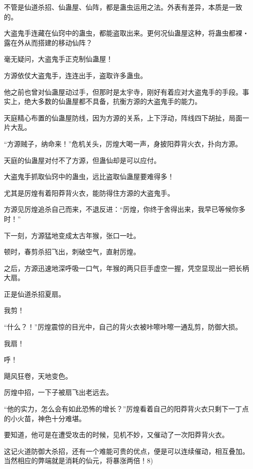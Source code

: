 \begin{this_body}
不管是仙道杀招、仙蛊屋、仙阵，都是蛊虫运用之法。外表有差异，本质是一致的。

大盗鬼手连藏在仙窍中的蛊虫，都能盗取出来。更何况仙蛊屋这种，将蛊虫都裸・露在外从而搭建的移动仙阵？

毫无疑问，大盗鬼手正克制仙蛊屋！

方源依仗大盗鬼手，连连出手，盗取许多蛊虫。

他之前也曾对仙蛊屋动过手，但那时是太宇寺，刚好有着应对大盗鬼手的手段。事实上，绝大多数的仙蛊屋都不具备，抗衡方源的大盗鬼手的能力。

天庭精心布置的仙蛊屋防线，因为方源的关系，上下浮动，阵线四下胡扯，局面一片大乱。

“方源贼子，纳命来！”危机关头，厉煌大喝一声，身披阳莽背火衣，扑向方源。

天庭的仙蛊屋对付不了方源，但蛊仙却是可以应付。

大盗鬼手抓取仙窍中的蛊虫，远比盗取仙蛊屋要难得多！

尤其是厉煌有着阳莽背火衣，能防得住方源的大盗鬼手。

方源见厉煌追杀自己而来，不退反进：“厉煌，你终于舍得出来，我早已等候你多时！”

下一刻，方源猛地变成太古年猴，张口一吐。

顿时，春剪杀招飞出，刺破空气，直射厉煌。

之后，方源迅速地深呼吸一口气，年猴的两只巨手虚空一握，凭空显现出一把长柄大扇。

正是仙道杀招夏扇。

我剪！

“什么？！”厉煌震惊的目光中，自己的背火衣被咔嚓咔嚓一通乱剪，防御大损。

我扇！

呼！

飓风狂卷，天地变色。

厉煌中招，一下子被扇飞出老远去。

“他的实力，怎么会有如此恐怖的增长？”厉煌看着自己的阳莽背火衣只剩下一丁点的小火苗，神色十分难堪。

要知道，他可是在遭受攻击的时候，见机不妙，又催动了一次阳莽背火衣。

这记火道防御大杀招，还有一个难能可贵的优点，便是可以连续催动，相互叠加。当然相应的弊端就是消耗的仙元，将暴涨两倍！8)

\end{this_body}

